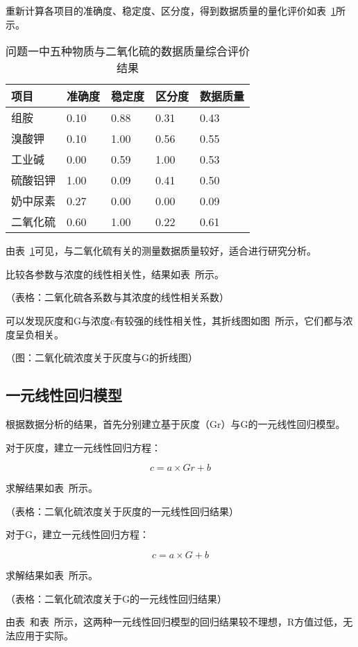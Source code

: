 重新计算各项目的准确度、稳定度、区分度，得到数据质量的量化评价如表~\ref{SO2_Judge}所示。

\begin{table}[]
    \centering
    \caption{问题一中五种物质与二氧化硫的数据质量综合评价结果}
    \label{SO2_Judge}
    \begin{tabular}{@{}lllll@{}}
    \toprule
    项目   & 准确度  & 稳定度  & 区分度  & 数据质量 \\ \midrule
    组胺   & 0.10 & 0.88 & 0.31 & 0.43 \\
    溴酸钾  & 0.10 & 1.00 & 0.56 & 0.55 \\
    工业碱  & 0.00 & 0.59 & 1.00 & 0.53 \\
    硫酸铝钾 & 1.00 & 0.09 & 0.41 & 0.50 \\
    奶中尿素 & 0.27 & 0.00 & 0.00 & 0.09 \\
    二氧化硫 & 0.60 & 1.00 & 0.22 & 0.61 \\ \bottomrule
    \end{tabular}
    \end{table}

由表~\ref{SO2_Judge}可见，与二氧化硫有关的测量数据质量较好，适合进行研究分析。

比较各参数与浓度的线性相关性，结果如表~所示。

（表格：二氧化硫各系数与其浓度的线性相关系数）

可以发现灰度和G与浓度c有较强的线性相关性，其折线图如图~所示，它们都与浓度呈负相关。

（图：二氧化硫浓度关于灰度与G的折线图）

\subsection{一元线性回归模型}

根据数据分析的结果，首先分别建立基于灰度（Gr）与G的一元线性回归模型。

对于灰度，建立一元线性回归方程：

$$c=a \times Gr+b$$

求解结果如表~所示。

（表格：二氧化硫浓度关于灰度的一元线性回归结果）

对于G，建立一元线性回归方程：

$$c=a \times G+b$$

求解结果如表~所示。

（表格：二氧化硫浓度关于G的一元线性回归结果）

由表~和表~所示，这两种一元线性回归模型的回归结果较不理想，R方值过低，无法应用于实际。

